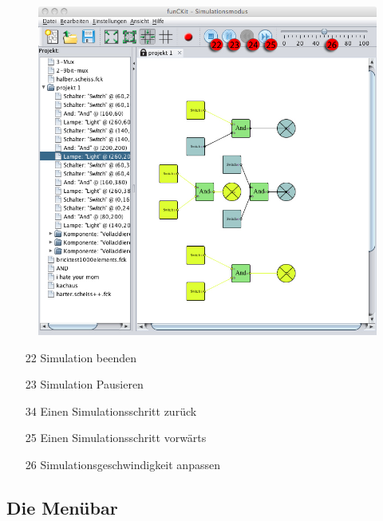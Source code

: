 \documentclass[12pt,a4paper]{scrartcl}
\begin{document}
\newpage

\begin{figure}[H]
	\centering
	\includegraphics[width=\linewidth]{images/neueBilder/simulationsmodusNummern.jpg}
\end{figure}

\begin{itemize}
  \item[22] Simulation beenden
  \item[23] Simulation Pausieren
  \item[34] Einen Simulationsschritt zurück
  \item[25] Einen Simulationsschritt vorwärts
  \item[26] Simulationsgeschwindigkeit anpassen
\end{itemize}

\subsection{Die Menübar}
\end{document}
